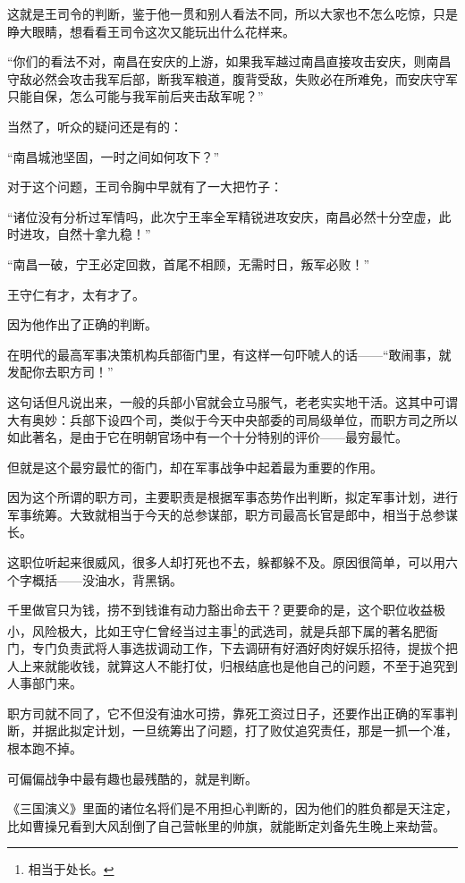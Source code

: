 \begin{multicols}{\theparacolNo}
这就是王司令的判断，鉴于他一贯和别人看法不同，所以大家也不怎么吃惊，只是睁大眼睛，想看看王司令这次又能玩出什么花样来。

“你们的看法不对，南昌在安庆的上游，如果我军越过南昌直接攻击安庆，则南昌守敌必然会攻击我军后部，断我军粮道，腹背受敌，失败必在所难免，而安庆守军只能自保，怎么可能与我军前后夹击敌军呢？”

当然了，听众的疑问还是有的：

“南昌城池坚固，一时之间如何攻下？”

对于这个问题，王司令胸中早就有了一大把竹子：

“诸位没有分析过军情吗，此次宁王率全军精锐进攻安庆，南昌必然十分空虚，此时进攻，自然十拿九稳！”

“南昌一破，宁王必定回救，首尾不相顾，无需时日，叛军必败！”

王守仁有才，太有才了。

因为他作出了正确的判断。

在明代的最高军事决策机构兵部衙门里，有这样一句吓唬人的话——“敢闹事，就发配你去职方司！”

这句话但凡说出来，一般的兵部小官就会立马服气，老老实实地干活。这其中可谓大有奥妙：兵部下设四个司，类似于今天中央部委的司局级单位，而职方司之所以如此著名，是由于它在明朝官场中有一个十分特别的评价——最穷最忙。

但就是这个最穷最忙的衙门，却在军事战争中起着最为重要的作用。

因为这个所谓的职方司，主要职责是根据军事态势作出判断，拟定军事计划，进行军事统筹。大致就相当于今天的总参谋部，职方司最高长官是郎中，相当于总参谋长。

这职位听起来很威风，很多人却打死也不去，躲都躲不及。原因很简单，可以用六个字概括——没油水，背黑锅。

千里做官只为钱，捞不到钱谁有动力豁出命去干？更要命的是，这个职位收益极小，风险极大，比如王守仁曾经当过主事\footnote{相当于处长。}的武选司，就是兵部下属的著名肥衙门，专门负责武将人事选拔调动工作，下去调研有好酒好肉好娱乐招待，提拔个把人上来就能收钱，就算这人不能打仗，归根结底也是他自己的问题，不至于追究到人事部门来。

职方司就不同了，它不但没有油水可捞，靠死工资过日子，还要作出正确的军事判断，并据此拟定计划，一旦统筹出了问题，打了败仗追究责任，那是一抓一个准，根本跑不掉。

可偏偏战争中最有趣也最残酷的，就是判断。

《三国演义》里面的诸位名将们是不用担心判断的，因为他们的胜负都是天注定，比如曹操兄看到大风刮倒了自己营帐里的帅旗，就能断定刘备先生晚上来劫营。


\end{multicols}

